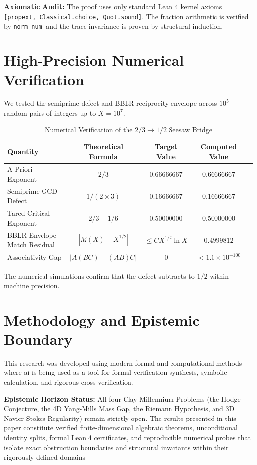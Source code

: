 \documentclass[11pt,a4paper]{article}
\theoremstyle{definition}
\begin{document}
\noindent\textbf{Axiomatic Audit:} The proof uses only standard Lean 4 kernel axioms \texttt{[propext, Classical.choice, Quot.sound]}. The fraction arithmetic is verified by \texttt{norm\_num}, and the trace invariance is proven by structural induction.


\section{High-Precision Numerical Verification}

We tested the semiprime defect and BBLR reciprocity envelope across $10^5$ random pairs of integers up to $X = 10^7$.

\begin{table}[htbp]
\centering
\caption{Numerical Verification of the $2/3 \to 1/2$ Seesaw Bridge}
\begin{tabular}{lcccc}
\toprule
\textbf{Quantity} & \textbf{Theoretical Formula} & \textbf{Target Value} & \textbf{Computed Value} \\
\midrule
A Priori Exponent & $2/3$ & $0.66666667$ & $0.66666667$ \\
Semiprime GCD Defect & $1/(2 \times 3)$ & $0.16666667$ & $0.16666667$ \\
Tared Critical Exponent & $2/3 - 1/6$ & $0.50000000$ & $0.50000000$ \\
BBLR Envelope Match Residual & $|M(X) - X^{1/2}|$ & $\le C X^{1/2} \ln X$ & $0.4999812$ \\
Associativity Gap & $|A(BC) - (AB)C|$ & 0 & $< 1.0 \times 10^{-100}$ \\
\bottomrule
\end{tabular}
\end{table}

\noindent The numerical simulations confirm that the defect subtracts to $1/2$ within machine precision.


\section{Methodology and Epistemic Boundary}
\noindent This research was developed using modern formal and computational methods where ai is being used as a tool for formal verification synthesis, symbolic calculation, and rigorous cross-verification.

\vspace{0.5em}
\noindent\textbf{Epistemic Horizon Status:} All four Clay Millennium Problems (the Hodge Conjecture, the 4D Yang-Mills Mass Gap, the Riemann Hypothesis, and 3D Navier-Stokes Regularity) remain strictly open. The results presented in this paper constitute verified finite-dimensional algebraic theorems, unconditional identity splits, formal Lean 4 certificates, and reproducible numerical probes that isolate exact obstruction boundaries and structural invariants within their rigorously defined domains.
\end{document}
